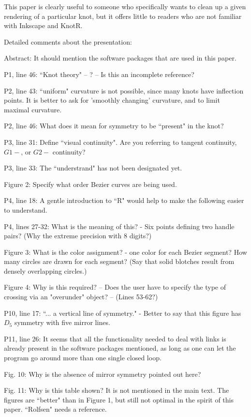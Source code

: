\documentclass[12pt]{article}
\begin{document}
This paper is clearly useful to someone who specifically wants to
clean up a given rendering of a particular knot, but it offers little
to readers who are not familiar with Inkscape and KnotR.

Detailed comments about the presentation:

Abstract: It should mention the software packages that are used in
this paper.

P1, line 46:  ``Knot theory" -- ?  -- Is this an incomplete reference?

P2, line 43: ``uniform" curvature is not possible, since many knots
have inflection points.  It is better to ask for 'smoothly changing'
curvature, and to limit maximal curvature.

P2, line 46: What does it mean for symmetry to be ``present" in the
knot?

P3, line 31: Define ``visual continuity".  Are you referring to tangent
continuity, $G1-$, or $G2-$ continuity?

P3, line 33:  The ``understrand" has not been designated yet.

Figure 2:  Specify what order Bezier curves are being used.

P4, line 18: A gentle introduction to ``R" would help to make the
following easier to understand.

P4, lines 27-32: What is the meaning of this? - Six points defining
two handle pairs?  (Why the extreme precision with 8 digits?)

Figure 3: What is the color assignment? - one color for each Bezier
segment?  How many circles are drawn for each segment?  (Say that
solid blotches result from densely overlapping circles.)

Figure 4: Why is this required?  -- Does the user have to specify the
type of crossing via an "overunder" object?  -- (Lines 53-62?)

P10, line 17: ``... a vertical line of symmetry." - Better to say that
this figure has $D_5$ symmetry with five mirror lines.

P11, line 26: It seems that all the functionality needed to deal with
links is already present in the software packages mentioned, as long
as one can let the program go around more than one single closed loop.

Fig. 10: Why is the absence of mirror symmetry pointed out here?

Fig. 11: Why is this table shown?  It is not mentioned in the main
text.  The figures are ``better" than in Figure 1, but still not
optimal in the spirit of this paper.  ``Rolfsen" needs a reference.
\end{document}
